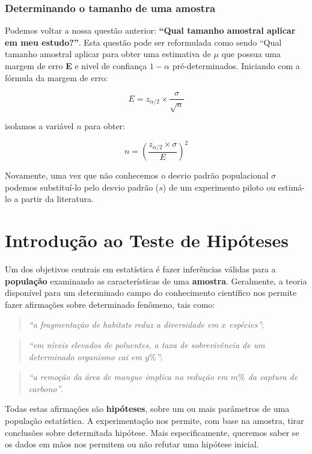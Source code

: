 \documentclass[
]{book}
\begin{document}
\hypertarget{determinando-o-tamanho-de-uma-amostra}{%
\subsection{Determinando o tamanho de uma amostra}\label{determinando-o-tamanho-de-uma-amostra}}

Podemos voltar a nossa questão anterior: \textbf{``Qual tamanho amostral aplicar em meu estudo?''}. Esta questão pode ser reformulada como sendo ``Qual tamanho amostral aplicar para obter uma estimativa de \(\mu\) que possua uma margem de erro \textbf{E} e nivel de confiança \(1-\alpha\) pré-determinados. Iniciando com a fórmula da margem de erro:

\[E = z_{\alpha/2} \times \frac{\sigma}{\sqrt{n}}\]

isolamos a variável \(n\) para obter:

\[n = (\frac{ z_{\alpha/2} \times \sigma}{E})^2\]

Novamente, uma vez que não conhecemos o desvio padrão populacional \(\sigma\) podemos substituí-lo pelo desvio padrão (\(s\)) de um experimento piloto ou estimá-lo a partir da literatura.

\hypertarget{th}{%
\chapter{Introdução ao Teste de Hipóteses}\label{th}}

Um dos objetivos centrais em estatística é fazer inferências válidas para a \textbf{população} examinando as características de uma \textbf{amostra}. Geralmente, a teoria disponível para um determinado campo do conhecimento científico nos permite fazer afirmações sobre determinado fenômeno, tais como:

\begin{quote}
\emph{``a fragmentação de habitats reduz a diversidade em \(x\) espécies''};
\end{quote}

\begin{quote}
\emph{``em níveis elevados de poluentes, a taxa de sobrevivência de um determinado organismo cai em \(y\%\)''};
\end{quote}

\begin{quote}
\emph{``a remoção da área de mangue implica na redução em \(m\%\) da captura de carbono''}.
\end{quote}

Todas estas afirmações são \textbf{hipóteses}, sobre um ou mais parâmetros de uma população estatística. A experimentação nos permite, com base na amostra, tirar conclusões sobre determitada hipótese. Mais especificamente, queremos saber se os dados em mãos nos permitem ou não refutar uma hipótese inicial.
\end{document}

